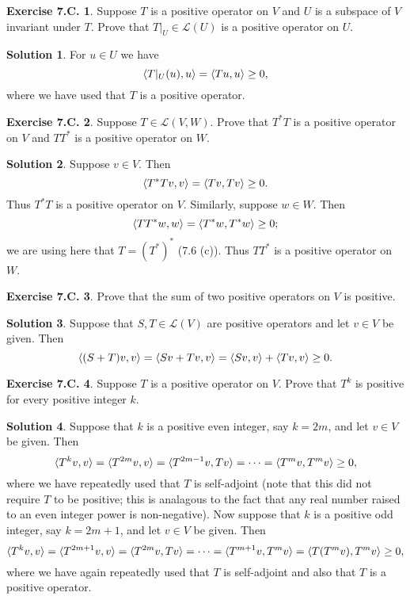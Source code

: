 \documentclass[12pt]{article}
\theoremstyle{definition}
\theoremstyle{exercise}
\newtheorem{exercise}{Exercise 7.C.}
\theoremstyle{solution}
\newtheorem*{solution}{Solution}
\newcommand{\lmap}{\mathcal{L}}
\DeclarePairedDelimiter\ip{\langle}{\rangle}
\begin{document}
\begin{exercise}
\label{ex:3}
    Suppose \( T \) is a positive operator on \( V \) and \( U \) is a subspace of \( V \) invariant under \( T \). Prove that \( T|_U \in \lmap(U) \) is a positive operator on \( U \).
\end{exercise}

\begin{solution}
    For \( u \in U \) we have
    \[
        \ip{T|_U (u), u} = \ip{Tu, u} \geq 0,
    \]
    where we have used that \( T \) is a positive operator.
\end{solution}

\begin{exercise}
\label{ex:4}
    Suppose \( T \in \lmap(V, W) \). Prove that \( T^* T \) is a positive operator on \( V \) and \( T T^* \) is a positive operator on \( W \).
\end{exercise}

\begin{solution}
    Suppose \( v \in V \). Then
    \[
        \ip{T^* T v, v} = \ip{Tv, Tv} \geq 0.
    \]
    Thus \( T^* T \) is a positive operator on \( V \). Similarly, suppose \( w \in W \). Then
    \[
        \ip{T T^* w, w} = \ip{T^* w, T^* w} \geq 0;
    \]
    we are using here that \( T = (T^*)^* \) (7.6 (c)). Thus \( T T^* \) is a positive operator on \( W \).
\end{solution}

\begin{exercise}
\label{ex:5}
    Prove that the sum of two positive operators on \( V \) is positive.
\end{exercise}

\begin{solution}
    Suppose that \( S, T \in \lmap(V) \) are positive operators and let \( v \in V \) be given. Then
    \[
        \ip{(S + T)v, v} = \ip{Sv + Tv, v} = \ip{Sv, v} + \ip{Tv, v} \geq 0.
    \]
\end{solution}

\begin{exercise}
\label{ex:6}
    Suppose \( T \) is a positive operator on \( V \). Prove that \( T^k \) is positive for every positive integer \( k \).
\end{exercise}

\begin{solution}
    Suppose that \( k \) is a positive even integer, say \( k = 2m \), and let \( v \in V \) be given. Then
    \[
        \ip{T^k v, v} = \ip{T^{2m} v, v} = \ip{T^{2m - 1} v, T v} = \cdots = \ip{T^m v, T^m v} \geq 0,
    \]
    where we have repeatedly used that \( T \) is self-adjoint (note that this did not require \( T \) to be positive; this is analagous to the fact that any real number raised to an even integer power is non-negative). Now suppose that \( k \) is a positive odd integer, say \( k = 2m + 1 \), and let \( v \in V \) be given. Then
    \[
        \ip{T^k v, v} = \ip{T^{2m + 1} v, v} = \ip{T^{2m} v, T v} = \cdots = \ip{T^{m + 1} v, T^m v} = \ip{T (T^m v), T^m v} \geq 0,
    \]
    where we have again repeatedly used that \( T \) is self-adjoint and also that \( T \) is a positive operator.
\end{solution}
\end{document}
